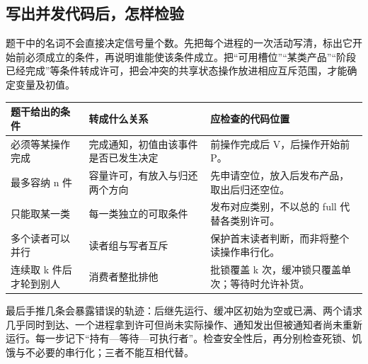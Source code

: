 \subsection{写出并发代码后，怎样检验}\label{OS02-method}

题干中的名词不会直接决定信号量个数。先把每个进程的一次活动写清，标出它开始前必须成立的条件，再说明谁能使该条件成立。把``可用槽位''``某类产品''``阶段已经完成''等条件转成许可，把会冲突的共享状态操作放进相应互斥范围，才能确定变量及初值。

\begin{wideblock}

\par\medskip\noindent\begin{minipage}{\linewidth}\fontsize{9.3}{12}\selectfont\begin{tabularx}{\linewidth}{@{}YYY@{}}
\toprule\noalign{}
\begin{minipage}[b]{\linewidth}\raggedright
题干给出的条件
\end{minipage} & \begin{minipage}[b]{\linewidth}\raggedright
转成什么关系
\end{minipage} & \begin{minipage}[b]{\linewidth}\raggedright
应检查的代码位置
\end{minipage} \\
\midrule\noalign{}


必须等某操作完成 & 完成通知，初值由该事件是否已发生决定 & 前操作完成后 V，后操作开始前 P。 \\
最多容纳 n 件 & 容量许可，有放入与归还两个方向 & 先申请空位，放入后发布产品，取出后归还空位。 \\
只能取某一类 & 每一类独立的可取条件 & 发布对应类别，不以总的 full 代替各类别许可。 \\
多个读者可以并行 & 读者组与写者互斥 & 保护首末读者判断，而非将整个读操作串行化。 \\
连续取 k 件后才轮到别人 & 消费者整批排他 & 批锁覆盖 k 次，缓冲锁只覆盖单次；等待时允许补货。 \\
\bottomrule\end{tabularx}
\end{minipage}\par\medskip

\end{wideblock}

最后手推几条会暴露错误的轨迹：后继先运行、缓冲区初始为空或已满、两个请求几乎同时到达、一个进程拿到许可但尚未实际操作、通知发出但被通知者尚未重新运行。每一步记下``持有---等待---可执行者''。检查安全性后，再分别检查死锁、饥饿与不必要的串行化；三者不能互相代替。

